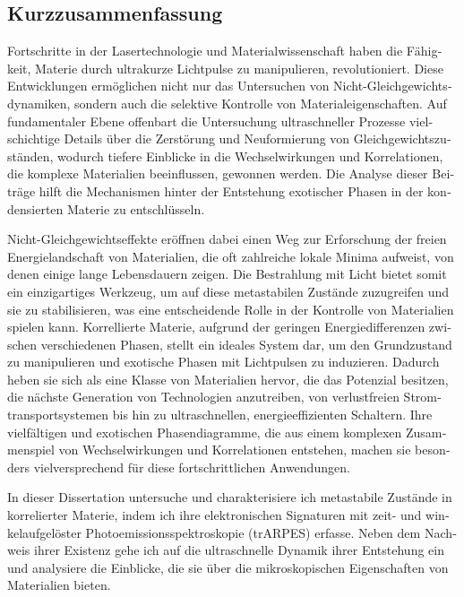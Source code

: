 \begin{otherlanguage}{german}
\cleardoublepage
\chapter*{Kurzzusammenfassung}
Fortschritte in der Lasertechnologie und Materialwissenschaft haben die Fähigkeit, Materie durch ultrakurze Lichtpulse zu manipulieren, revolutioniert.
Diese Entwicklungen ermöglichen nicht nur das Untersuchen von Nicht-Gleichgewichtsdynamiken, sondern auch die selektive Kontrolle von Materialeigenschaften.
Auf fundamentaler Ebene offenbart die Untersuchung ultraschneller Prozesse vielschichtige Details über die Zerstörung und Neuformierung von Gleichgewichtszuständen, wodurch tiefere Einblicke in die Wechselwirkungen und Korrelationen, die komplexe Materialien beeinflussen, gewonnen werden.
Die Analyse dieser Beiträge hilft die Mechanismen hinter der Entstehung exotischer Phasen in der kondensierten Materie zu entschlüsseln.

Nicht-Gleichgewichtseffekte eröffnen dabei einen Weg zur Erforschung der freien Energielandschaft von Materialien, die oft zahlreiche lokale Minima aufweist, von denen einige lange Lebensdauern zeigen.
Die Bestrahlung mit Licht bietet somit ein einzigartiges Werkzeug, um auf diese metastabilen Zustände zuzugreifen und sie zu stabilisieren, was eine entscheidende Rolle in der Kontrolle von Materialien spielen kann.
Korrellierte Materie, aufgrund der geringen Energiedifferenzen zwischen verschiedenen Phasen, stellt ein ideales System dar, um den Grundzustand zu manipulieren und exotische Phasen mit Lichtpulsen zu induzieren.
Dadurch heben sie sich als eine Klasse von Materialien hervor, die das Potenzial besitzen, die nächste Generation von Technologien anzutreiben, von verlustfreien Stromtransportsystemen bis hin zu ultraschnellen, energieeffizienten Schaltern.
Ihre vielfältigen und exotischen Phasendiagramme, die aus einem komplexen Zusammenspiel von Wechselwirkungen und Korrelationen entstehen, machen sie besonders vielversprechend für diese fortschrittlichen Anwendungen. \hfill\break

In dieser Dissertation untersuche und charakterisiere ich metastabile Zustände in korrelierter Materie, indem ich ihre elektronischen Signaturen mit zeit- und winkelaufgelöster Photoemissionsspektroskopie (trARPES) erfasse.
Neben dem Nachweis ihrer Existenz gehe ich auf die ultraschnelle Dynamik ihrer Entstehung ein und analysiere die Einblicke, die sie über die mikroskopischen Eigenschaften von Materialien bieten. \hfill\break


\end{otherlanguage}
